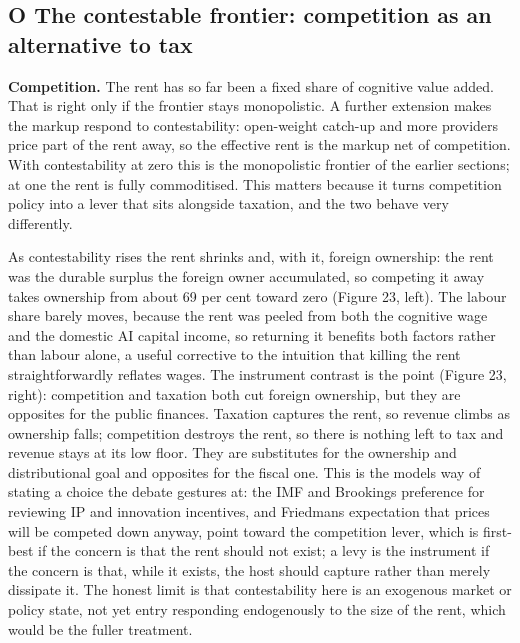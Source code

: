 \documentclass[11pt]{article}
\begin{document}
\hypertarget{o-the-contestable-frontier-competition-as-an-alternative-to-tax}{%
\subsection{O \textperiodcentered{} The contestable frontier: competition as an alternative
to
tax}\label{o-the-contestable-frontier-competition-as-an-alternative-to-tax}}

\textbf{Competition.} The rent has so far been a fixed share of
cognitive value added. That is right only if the frontier stays
monopolistic. A further extension makes the markup respond to
contestability: open-weight catch-up and more providers price part of
the rent away, so the effective rent is the markup net of competition.
With contestability at zero this is the monopolistic frontier of the
earlier sections; at one the rent is fully commoditised. This matters
because it turns competition policy into a lever that sits alongside
taxation, and the two behave very differently.

As contestability rises the rent shrinks and, with it, foreign
ownership: the rent was the durable surplus the foreign owner
accumulated, so competing it away takes ownership from about 69 per cent
toward zero (Figure 23, left). The labour share barely moves, because
the rent was peeled from both the cognitive wage and the domestic AI
capital income, so returning it benefits both factors rather than labour
alone, a useful corrective to the intuition that killing the rent
straightforwardly reflates wages. The instrument contrast is the point
(Figure 23, right): competition and taxation both cut foreign ownership,
but they are opposites for the public finances. Taxation captures the
rent, so revenue climbs as ownership falls; competition destroys the
rent, so there is nothing left to tax and revenue stays at its low
floor. They are substitutes for the ownership and distributional goal
and opposites for the fiscal one. This is the model\textquotesingle s
way of stating a choice the debate gestures at: the IMF and Brookings
preference for reviewing IP and innovation incentives, and
Friedman\textquotesingle s expectation that prices will be competed down
anyway, point toward the competition lever, which is first-best if the
concern is that the rent should not exist; a levy is the instrument if
the concern is that, while it exists, the host should capture rather
than merely dissipate it. The honest limit is that contestability here
is an exogenous market or policy state, not yet entry responding
endogenously to the size of the rent, which would be the fuller
treatment.
\end{document}
